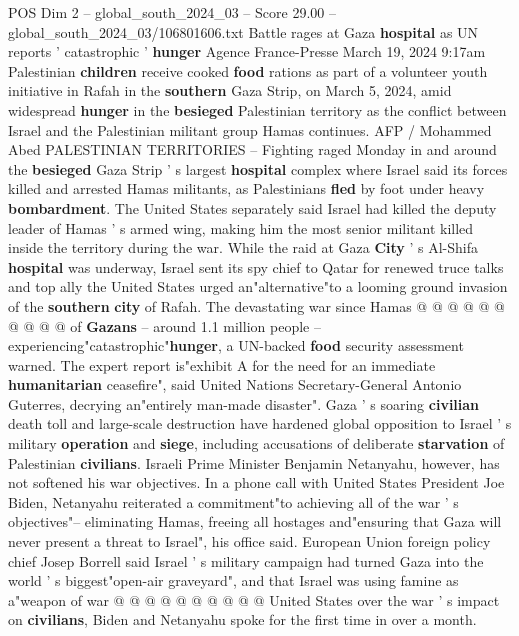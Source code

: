 \begin{textsample}{POS Dim 2 – global\_south\_2024\_03 – Score 29.00 – global\_south\_2024\_03/106801606.txt}  \label{ex:f2_pos_004}
Battle rages at Gaza \textbf{hospital} as UN reports ' catastrophic ' \textbf{hunger} Agence France-Presse March 19, 2024 9:17am Palestinian \textbf{children} receive cooked \textbf{food} rations as part of a volunteer youth initiative in Rafah in the \textbf{southern} Gaza Strip, on March 5, 2024, amid widespread \textbf{hunger} in the \textbf{besieged} Palestinian territory as the conflict between Israel and the Palestinian militant group Hamas continues.
AFP / Mohammed Abed PALESTINIAN TERRITORIES -- Fighting raged Monday in and around the \textbf{besieged} Gaza Strip ' s largest \textbf{hospital} complex where Israel said its forces killed and arrested Hamas militants, as Palestinians \textbf{fled} by foot under heavy \textbf{bombardment}.
The United States separately said Israel had killed the deputy leader of Hamas ' s armed wing, making him the most senior militant killed inside the territory during the war.
While the raid at Gaza \textbf{City} ' s Al-Shifa \textbf{hospital} was underway, Israel sent its spy chief to Qatar for renewed truce talks and top ally the United States urged an"alternative"to a looming ground invasion of the \textbf{southern} \textbf{city} of Rafah.
The devastating war since Hamas @ @ @ @ @ @ @ @ @ @ of \textbf{Gazans} -- around 1.1 million people -- experiencing"catastrophic"\textbf{hunger}, a UN-backed \textbf{food} security assessment warned.
The expert report is"exhibit A for the need for an immediate \textbf{humanitarian} ceasefire", said United Nations Secretary-General Antonio Guterres, decrying an"entirely man-made disaster".
Gaza ' s soaring \textbf{civilian} death toll and large-scale destruction have hardened global opposition to Israel ' s military \textbf{operation} and \textbf{siege}, including accusations of deliberate \textbf{starvation} of Palestinian \textbf{civilians}.
Israeli Prime Minister Benjamin Netanyahu, however, has not softened his war objectives.
In a phone call with United States President Joe Biden, Netanyahu reiterated a commitment"to achieving all of the war ' s objectives"-- eliminating Hamas, freeing all hostages and"ensuring that Gaza will never present a threat to Israel", his office said.
European Union foreign policy chief Josep Borrell said Israel ' s military campaign had turned Gaza into the world ' s biggest"open-air graveyard", and that Israel was using famine as a"weapon of war @ @ @ @ @ @ @ @ @ @ United States over the war ' s impact on \textbf{civilians}, Biden and Netanyahu spoke for the first time in over a month.

\end{textsample}
